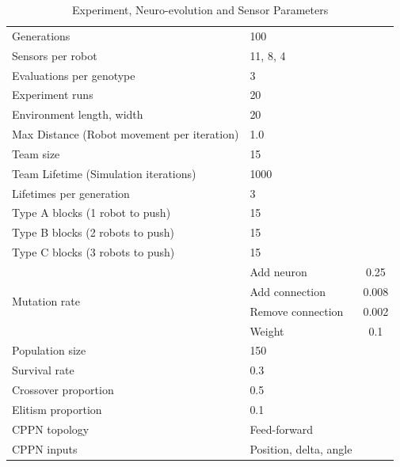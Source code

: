 \begin{table}
	\renewcommand{\arraystretch}{1.30}
	\caption{Experiment, Neuro-evolution and Sensor Parameters}\label{tab:simParameters}
	\centering
	\begin{tabular}{llc}
		\hline
		Generations	                                           & 100	\\
		Sensors per robot                                      & 11, 8, 4 \\	
		Evaluations per genotype                               & 3  \\
		Experiment runs                                        & 20 \\
		Environment length, width                              & 20 \\
		Max Distance (Robot movement per iteration)            & 1.0 \\
		Team size                                              & 15 \\
		Team Lifetime (Simulation iterations)                  & 1000 \\	
		Lifetimes per generation                               & 3 \\
		Type A blocks (1 robot to push)                        & 15 \\
		Type B blocks (2 robots to push)                       & 15 \\
		Type C blocks (3 robots to push)                       & 15 \\
		\hline
		\multirow{4}{*}{Mutation rate} & Add neuron            & 0.25 \\
		& Add connection                                       & 0.008  \\
		& Remove connection                                    & 0.002 \\
		& Weight                                               & 0.1  \\
		Population size                                        & 150 \\
		Survival rate                                          & 0.3 \\
		Crossover proportion                                   & 0.5 \\
		Elitism proportion                                     & 0.1 \\
		CPPN topology                                          & Feed-forward           \\
		CPPN inputs                                            & Position, delta, angle \\

\end{tabular}
\end{table}
